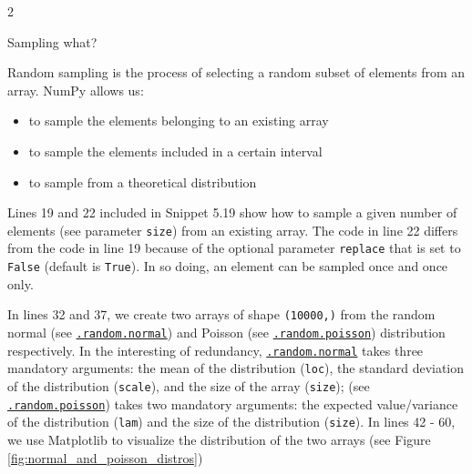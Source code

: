 \documentclass[a4paper,11pt]{book}
\newcommand{\question}[1]{%
    \begin{tcolorbox}[colback=comp_c!10,colframe=comp_c,sidebyside align=top,width=\linewidth,before skip=1ex]
        #1
    \end{tcolorbox}
    \switchcolumn%
}
\newcommand{\note}[1]{%
    \begin{tcolorbox}[colback=white!0,colframe=white!10,width=\linewidth,before skip=1ex]
        #1
    \end{tcolorbox}
}
\begin{document}
\begin{paracol}{2}
	\question{\raggedright Sampling what?}
	\note{Random sampling is the process of selecting a random subset of elements from an array. NumPy allows us:
	\begin{itemize}
		\item to sample the elements belonging to an existing array
		\item to sample the elements included in a certain interval
		\item to sample from a theoretical distribution
	\end{itemize}
	
	\quad Lines 19 and 22 included in Snippet 5.19 show how to sample a given number of elements (see parameter \texttt{size}) from an existing array. The code in line 22 differs from the code in line 19 because of the optional parameter \texttt{replace} that is set to \texttt{False} (default is \texttt{True}). In so doing, an element can be sampled once and once only.
	
	\quad In lines 32 and 37, we create two arrays of shape \texttt{(10000,)} from the random normal (see \href{https://numpy.org/doc/stable/reference/random/generated/numpy.random.Generator.normal.html}{\texttt{.random.normal}}) and Poisson (see \href{https://numpy.org/doc/stable/reference/random/generated/numpy.random.Generator.poisson.html}{\texttt{.random.poisson}}) distribution respectively. In the interesting of redundancy, \href{https://numpy.org/doc/stable/reference/random/generated/numpy.random.Generator.normal.html}{\texttt{.random.normal}} takes three mandatory arguments: the mean of the distribution (\texttt{loc}), the standard deviation of the distribution (\texttt{scale}), and the size of the array (\texttt{size}); (see \href{https://numpy.org/doc/stable/reference/random/generated/numpy.random.Generator.poisson.html}{\texttt{.random.poisson}}) takes two mandatory arguments: the expected value/variance of the distribution (\texttt{lam}) and the size of the distribution (\texttt{size}). In lines 42 - 60, we use Matplotlib to visualize the distribution of the two arrays (see Figure \ref{fig:normal_and_poisson_distros}) 
	}
\end{paracol}
\end{document}
